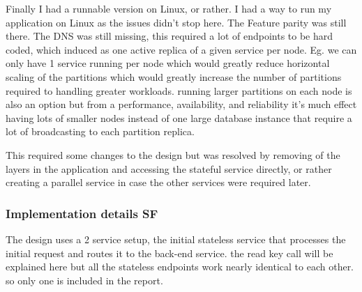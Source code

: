 \documentclass[a4paper,10pt,titlepage]{report}
\begin{document}
    Finally I had a runnable version on Linux, or rather. I had a way to run my application on Linux as the issues didn't stop here. The Feature parity was still there. The DNS was still missing, this required a lot of endpoints to be hard coded, which induced as one active replica of a given service per node. Eg. we can only have 1 service running per node which would greatly reduce horizontal scaling of the partitions which would greatly increase the number of partitions required to handling greater workloads. running larger partitions on each node is also an option but from a performance, availability, and reliability it's much effect having lots of smaller nodes instead of one large database instance that require a lot of broadcasting to each partition replica.


    This required some changes to the design but was resolved by removing of the layers in the application and accessing the stateful service directly, or rather creating a parallel service in case the other services were required later.

    \subsubsection{Implementation details SF}
        
        
        The design uses a 2 service setup, the initial stateless service that processes the initial request and routes it to the back-end service. the read key call will be explained here but all the stateless endpoints work nearly identical to each other. so only one is included in the report.\\
        
\end{document}
